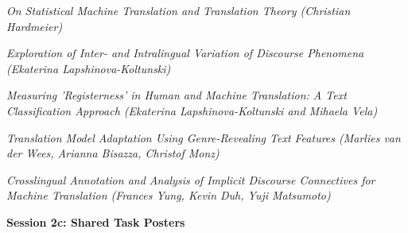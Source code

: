 \vspace{0.5ex}
\item[$\bullet$] \textit{On Statistical Machine Translation and Translation Theory (Christian Hardmeier)}

\vspace{0.5ex}
\item[$\bullet$] \textit{Exploration of Inter- and Intralingual Variation of Discourse Phenomena (Ekaterina Lapshinova-Koltunski)}

\vspace{0.5ex}
\item[$\bullet$] \textit{Measuring ’Registerness’ in Human and Machine Translation: A Text Classification Approach (Ekaterina Lapshinova-Koltunski and Mihaela Vela)}

\vspace{0.5ex}
\item[$\bullet$] \textit{Translation Model Adaptation Using Genre-Revealing Text Features (Marlies van der Wees, Arianna Bisazza, Christof Monz)}

\vspace{0.5ex}
\item[$\bullet$] \textit{Crosslingual Annotation and Analysis of Implicit Discourse Connectives for Machine Translation (Frances Yung, Kevin Duh, Yuji Matsumoto)}

\vspace{0.75ex}
\item[11:00--12:30] {\bfseries Session 2c: Shared Task Posters}

\vspace{0.5ex}
\item[$\bullet$] 

\vspace{0.5ex}
\item[$\bullet$] 

\vspace{0.5ex}
\item[$\bullet$] 

\vspace{0.5ex}
\item[$\bullet$] 

\vspace{0.5ex}
\item[$\bullet$] 

\vspace{0.5ex}
\item[$\bullet$] 

